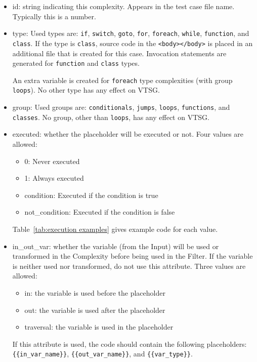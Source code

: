\begin{itemize}
    \item id: string indicating this complexity.  Appears in the test case
      file name.  Typically this is a number.

    \item type: Used types are: \verb|if|, \verb|switch|, \verb|goto|,
    \verb|for|, \verb|foreach|, \verb|while|,
    \verb|function|, and \verb|class|.
    If the type is \verb|class|, source code in the \verb|<body></body>| is placed in
    an additional file that is created for this case.
    Invocation statements are generated for \verb|function| and \verb|class| types.

    An extra variable is created for \verb|foreach| type complexities (with group
    \verb|loops|).
    No other type has any effect on VTSG.

    \item group: Used groups are: \verb|conditionals|, \verb|jumps|,
    \verb|loops|, \verb|functions|, and \verb|classes|.
    No group, other than \verb|loops|, has any effect on VTSG.

    \item executed: whether the placeholder will be executed or not. Four 
    values are allowed:
    \begin{itemize}[nosep]
        \item 0: Never executed
        \item 1: Always executed
        \item condition:  Executed if the condition is true
        \item not\_condition:  Executed if the condition is false
    \end{itemize}
    Table~\ref{tab:execution examples} gives example code for each value.

    \item in\_out\_var: whether the variable (from the Input) will be used or
    transformed in the Complexity before being used in the Filter.  If the
    variable is neither used nor transformed, do not use this attribute.
    Three values are allowed:
    \begin{itemize}[nosep]
        \item in: the variable is used before the placeholder
        \item out: the variable is used after the placeholder
        \item traversal: the variable is used in the placeholder
    \end{itemize}
    If this attribute is used, the code should contain the following
    placeholders: \\
    \verb|{{in_var_name}}|, \verb|{{out_var_name}}|, and \verb|{{var_type}}|.


\end{itemize}

